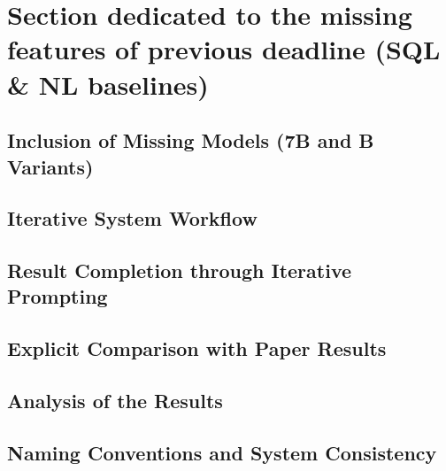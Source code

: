 \section{Section dedicated to the missing features of previous deadline (SQL \& NL baselines)}

\subsection{Inclusion of Missing Models (7B and B Variants)}

\subsection{Iterative System Workflow}

\subsection{Result Completion through Iterative Prompting}

\subsection{Explicit Comparison with Paper Results}

\subsection{Analysis of the Results}

\subsection{Naming Conventions and System Consistency}


